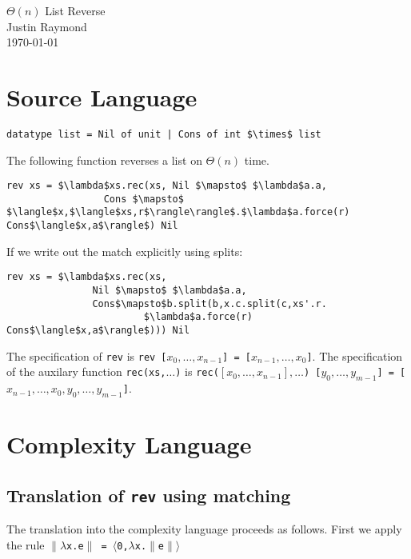 \documentclass[12pt,letterpaper]{article}
\begin{document}
\begin{flushright}
$\Theta(n)$ List Reverse\\
Justin Raymond\\
\today
\end{flushright}

\section*{Source Language}
\lstset{mathescape=true,basicstyle=\ttfamily}
\begin{lstlisting}
datatype list = Nil of unit | Cons of int $\times$ list
\end{lstlisting}

The following function reverses a list on $\Theta(n)$ time.
\begin{framed}
  \begin{small}
\begin{lstlisting}
rev xs = $\lambda$xs.rec(xs, Nil $\mapsto$ $\lambda$a.a,
                 Cons $\mapsto$ $\langle$x,$\langle$xs,r$\rangle\rangle$.$\lambda$a.force(r) Cons$\langle$x,a$\rangle$) Nil
\end{lstlisting}
\end{small}
\end{framed}
If we write out the match explicitly using splits:
\begin{framed}
\begin{small}
\begin{lstlisting}
rev xs = $\lambda$xs.rec(xs,
               Nil $\mapsto$ $\lambda$a.a,
               Cons$\mapsto$b.split(b,x.c.split(c,xs'.r.
                        $\lambda$a.force(r) Cons$\langle$x,a$\rangle$))) Nil
\end{lstlisting}
\end{small}
\end{framed}
The specification of \texttt{rev} is \texttt{rev [$x_0,\dots,x_{n-1}$] = [$x_{n-1},\dots,x_0$]}.
The specification of the auxilary function \texttt{rec(xs,$\dots$)} is \texttt{rec($[x_0,\dots,x_{n-1}],\dots$) [$y_0,\dots,y_{m-1}$] = [$x_{n-1},\dots,x_0,y_0,\dots,y_{m-1}$]}.

\section*{Complexity Language}
\subsection*{Translation of \texttt{rev} using matching}
The translation into the complexity language proceeds as follows.
First we apply the rule \texttt{$\|\lambda$x.e$\|$ = $\langle$0,$\lambda$x.$\|$e$\|\rangle$}
\end{document}
